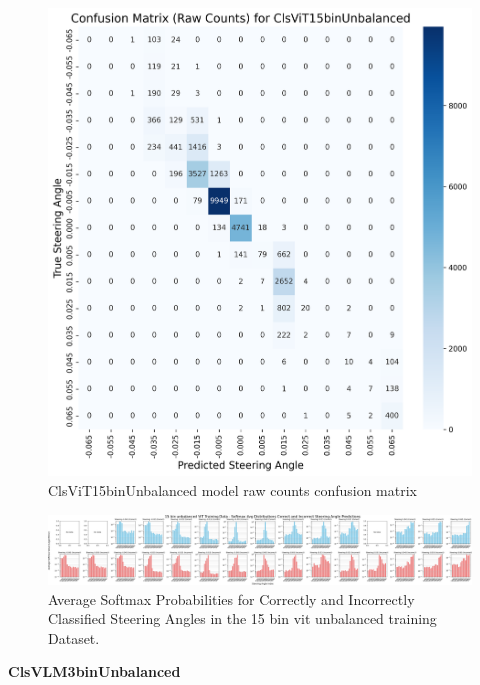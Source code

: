 \begin{figure}[H]
\centering
\includegraphics[width=1\linewidth]{Figures/Results/cm_raw_ClsViT15binUnbalanced.png}
\caption{ClsViT15binUnbalanced model raw counts confusion matrix}
\label{fig:cm_raw_ClsViT15binUnbalanced}
\end{figure}

\begin{figure}[H]
    \centering
    \includegraphics[width=1\linewidth]{Figures/Results/15_bins_vit_softmax_dist_plot_unbalanced.png}
    \caption{Average Softmax Probabilities for Correctly and Incorrectly Classified Steering Angles in the 15 bin vit unbalanced training Dataset.}
    \label{fig:15_bins_vit_softmax_dist_unbalanced}
\end{figure}


\textbf{ClsVLM3binUnbalanced}

